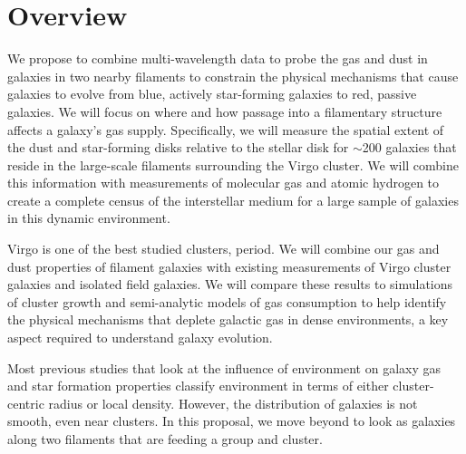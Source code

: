 \documentclass[11pt, preprint]{aastex}
\newcommand{\ha}{$H\alpha$}
\begin{document}
\section{Overview}
\vspace*{-.4cm}
We propose to combine multi-wavelength data to probe the gas and dust
in galaxies in two nearby filaments to constrain the physical mechanisms that cause galaxies to evolve from 
blue, actively star-forming galaxies to red, passive galaxies. We will focus on where 
and how passage into a filamentary structure affects a galaxy's gas
supply.  Specifically, we will measure the spatial extent 
of the dust and star-forming disks relative to the stellar disk for $\sim$200
galaxies that reside in the large-scale filaments surrounding the
Virgo cluster.  We will combine this information with measurements of
molecular gas and atomic hydrogen to create a complete census of the
interstellar medium for a large sample of galaxies in this dynamic
environment.  

Virgo is one of the best studied clusters, period.  
We will combine our gas and dust properties of
filament galaxies with existing measurements of Virgo cluster galaxies
and isolated field galaxies.  
We will compare these results to simulations of cluster growth and
semi-analytic models of gas consumption to help identify the physical mechanisms 
that deplete galactic gas in dense environments, a key aspect required to understand galaxy evolution. 

Most previous studies that look at the influence of environment on
galaxy gas and star formation properties classify environment in terms
of either cluster-centric radius or local density.  However, the
distribution of galaxies is not smooth, even near clusters.  In this
proposal, we move beyond  to look as galaxies along two filaments that
are feeding a group and cluster.



\end{document}
